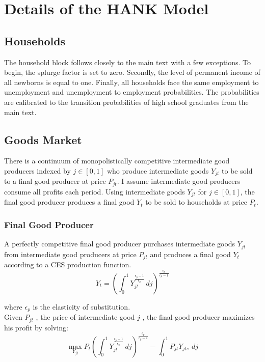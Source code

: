 \documentclass[\econtexRoot/HAFiscal]{subfiles}
\begin{document}
	
\FloatBarrier
\hypertarget{hank_appendix}{}\par\section{Details of the HANK Model}
\notinsubfile{\label{sec:hank_appendix}}


\subsection{Households}

The household block follows closely to the main text with a few exceptions. To begin, the splurge factor is set to zero. Secondly, the level of permanent income of all newborns is equal to one. Finally, all households face the same employment to unemployment and unemployment to employment probabilities. The probabilities are calibrated to the transition probabilities of high school graduates from the main text.


\subsection{Goods Market}

There is a continuum of  monopolistically competitive intermediate good producers indexed by $j \in [0,1]$ who produce intermediate goods $Y_{jt}$ to be sold to a final good producer at price $P_{jt}$. I assume intermediate good producers consume all profits each period. Using intermediate goods $Y_{jt}$ for $j \in [0,1]$, the  final good producer produces a final good $Y_{t}$ to be sold to households at price $P_{t}$.  \\ 


\subsubsection{Final Good Producer}

A perfectly competitive final good producer purchases intermediate goods $Y_{jt}$ from intermediate good producers at price $P_{jt}$ and produces a final good $Y_{t}$ according to a CES production function. 
$$ Y_{t} = \left(\int_{0}^{1} Y_{jt}^{\frac{\epsilon_{p}-1}{\epsilon_{p}}}\, dj\right)^{\frac{\epsilon_{p}}{\epsilon_{p}-1}}$$ 

where $\epsilon_{p}$ is the elasticity of substitution. \\

Given $P_{jt}$ , the price of intermediate good $j$ ,  the final good producer maximizes his profit by solving:
$$ \max_{Y_{jt}} P_{t} \left(\int_{0}^{1} Y_{jt}^{\frac{\epsilon_{p}-1}{\epsilon_{p}}}\, dj\right)^{\frac{\epsilon_{p}}{\epsilon_{p}-1}} - \int_{0}^{1} P_{jt} Y_{jt} ,\ dj $$ 
\vspace{.2cm}
\end{document}
